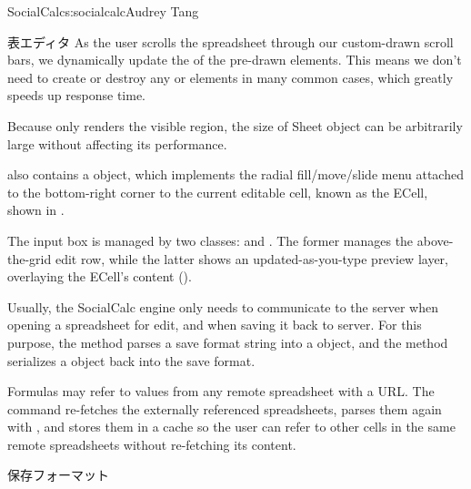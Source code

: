 \begin{aosachapter}{SocialCalc}{s:socialcalc}{Audrey Tang}
\begin{aosasect1}{表エディタ}
As the user scrolls the spreadsheet through our custom-drawn scroll
bars, we dynamically update the  of the pre-drawn
 elements.  This means we don't need to
create or destroy any  or
 elements in many common cases,
which greatly speeds up response time.

Because  only renders the visible region, the size
of Sheet object can be arbitrarily large without affecting its
performance.

 also contains a  object, which
implements the radial fill/move/slide menu attached to the
bottom-right corner to the current editable cell, known as the ECell,
shown in .


The input box is managed by two classes:  and
.  The former manages the above-the-grid edit row,
while the latter shows an updated-as-you-type preview layer,
overlaying the ECell's content ().


Usually, the SocialCalc engine only needs to communicate to the server
when opening a spreadsheet for edit, and when saving it back to
server.  For this purpose, the  method
parses a save format string into a  object, and the
 method serializes a  object
back into the save format.

Formulas may refer to values from any remote spreadsheet with a URL.
The  command re-fetches the externally referenced
spreadsheets, parses them again with , and
stores them in a cache so the user can refer to other cells in the
same remote spreadsheets without re-fetching its content.

\end{aosasect1}

\begin{aosasect1}{保存フォーマット}


\end{aosasect1}
\end{aosachapter}
